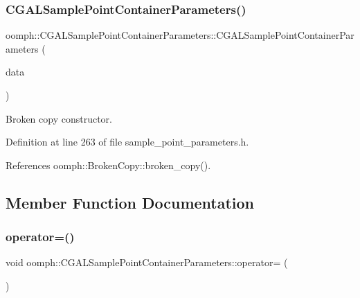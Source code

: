 \subsubsection{\texorpdfstring{C\+G\+A\+L\+Sample\+Point\+Container\+Parameters()}{CGALSamplePointContainerParameters()}\hspace{0.1cm}{\footnotesize\ttfamily [2/2]}}
{\footnotesize\ttfamily oomph\+::\+C\+G\+A\+L\+Sample\+Point\+Container\+Parameters\+::\+C\+G\+A\+L\+Sample\+Point\+Container\+Parameters (\begin{DoxyParamCaption}\item[{const \hyperlink{classoomph_1_1CGALSamplePointContainerParameters}{C\+G\+A\+L\+Sample\+Point\+Container\+Parameters} \&}]{data }\end{DoxyParamCaption})\hspace{0.3cm}{\ttfamily [inline]}}



Broken copy constructor. 



Definition at line 263 of file sample\+\_\+point\+\_\+parameters.\+h.



References oomph\+::\+Broken\+Copy\+::broken\+\_\+copy().



\subsection{Member Function Documentation}
\mbox{\label{classoomph_1_1CGALSamplePointContainerParameters_a41ed00b3d08398968b8492085cb2abb5}} 
\subsubsection{\texorpdfstring{operator=()}{operator=()}}
{\footnotesize\ttfamily void oomph\+::\+C\+G\+A\+L\+Sample\+Point\+Container\+Parameters\+::operator= (\begin{DoxyParamCaption}\item[{const \hyperlink{classoomph_1_1CGALSamplePointContainerParameters}{C\+G\+A\+L\+Sample\+Point\+Container\+Parameters} \&}]{ }\end{DoxyParamCaption})\hspace{0.3cm}{\ttfamily [inline]}}



